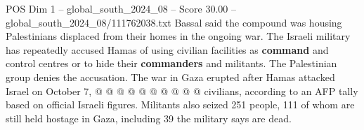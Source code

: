 \begin{textsample}{POS Dim 1 – global\_south\_2024\_08 – Score 30.00 – global\_south\_2024\_08/111762038.txt}
Bassal said the compound was housing Palestinians displaced from their homes in the ongoing war.
The Israeli military has repeatedly accused Hamas of using civilian facilities as \textbf{command} and control centres or to hide their \textbf{commanders} and militants.
The Palestinian group denies the accusation.
The war in Gaza erupted after Hamas attacked Israel on October 7, @ @ @ @ @ @ @ @ @ @ civilians, according to an AFP tally based on official Israeli figures.
Militants also seized 251 people, 111 of whom are still held hostage in Gaza, including 39 the military says are dead.

\end{textsample}

